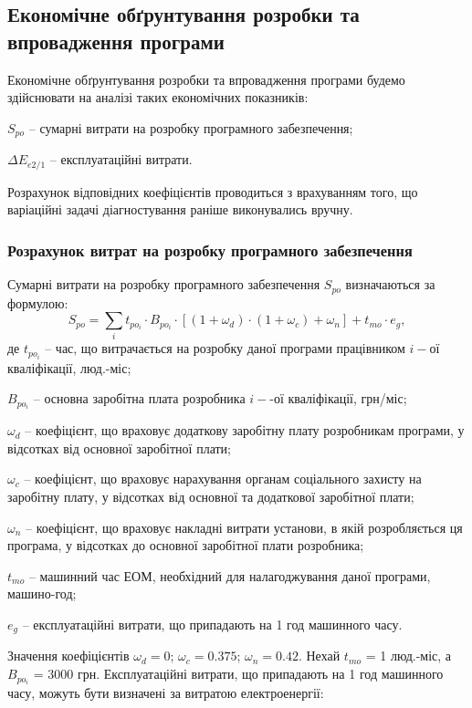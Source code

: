 \subsection{Економічне обґрунтування розробки та впровадження програми}
Економічне обґрунтування розробки та впровадження програми будемо здійснювати на аналізі таких економічних показників:
\par $S_{po}$ -- сумарні витрати на розробку програмного забезпечення;
\par $\Delta{E_{e2/1}}$ -- експлуатаційні витрати.
\par Розрахунок відповідних коефіцієнтів проводиться з врахуванням того, що варіаційні задачі діагностування раніше виконувались вручну.

\subsubsection{Розрахунок витрат на розробку програмного забезпечення}
Сумарні витрати на розробку програмного забезпечення $S_{po}$ визначаються за формулою:
\begin{equation}
	S_{po} = \sum_{i}t_{po_{i}}\cdot{B_{po_{i}}}\cdot{[(1+\omega_{d})\cdot{(1+\omega_{c})}+\omega_{n}]}+t_{mo}\cdot{e_{g}},
\end{equation}
де $t_{po_{i}}$ -- час, що витрачається на розробку даної програми працівником $i-$ої кваліфікації, люд.-міс;
\par $B_{po_{i}}$ -- основна заробітна плата розробника $i-$-ої кваліфікації, грн/міс;
\par $\omega_{d}$ -- коефіцієнт, що враховує додаткову заробітну плату розробникам програми, у відсотках від основної заробітної плати;
\par $\omega_{c}$ -- коефіцієнт, що враховує нарахування органам соціального захисту на заробітну плату, у відсотках від основної та додаткової заробітної плати;
\par $\omega_{n}$ -- коефіцієнт, що враховує накладні витрати установи, в якій розробляється ця програма, у відсотках до основної заробітної плати розробника;
\par $t_{mo}$ -- машинний час ЕОМ, необхідний для налагоджування даної програми, машино-год;
\par $e_{g}$ -- експлуатаційні витрати, що припадають на 1 год машинного часу.

\par Значення коефіцієнтів $\omega_{d}=0$; $\omega_{c}=0.375$; $\omega_{n}=0.42$. Нехай $t_{mo}$ = 1 люд.-міс, а $B_{po_{i}}$ = 3000 грн. Експлуатаційні витрати, що припадають на 1 год машинного часу, можуть бути визначені за витратою електроенергії:

